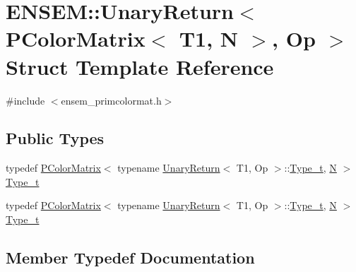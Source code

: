 \hypertarget{structENSEM_1_1UnaryReturn_3_01PColorMatrix_3_01T1_00_01N_01_4_00_01Op_01_4}{}\section{E\+N\+S\+EM\+:\+:Unary\+Return$<$ P\+Color\+Matrix$<$ T1, N $>$, Op $>$ Struct Template Reference}
\label{structENSEM_1_1UnaryReturn_3_01PColorMatrix_3_01T1_00_01N_01_4_00_01Op_01_4}


{\ttfamily \#include $<$ensem\+\_\+primcolormat.\+h$>$}

\subsection*{Public Types}
\begin{DoxyCompactItemize}
\item 
typedef \mbox{\hyperlink{classENSEM_1_1PColorMatrix}{P\+Color\+Matrix}}$<$ typename \mbox{\hyperlink{structENSEM_1_1UnaryReturn}{Unary\+Return}}$<$ T1, Op $>$\+::\mbox{\hyperlink{structENSEM_1_1UnaryReturn_3_01PColorMatrix_3_01T1_00_01N_01_4_00_01Op_01_4_a2b137e72bb2c6ed25df4d747fd568a79}{Type\+\_\+t}}, \mbox{\hyperlink{operator__name__util_8cc_a7722c8ecbb62d99aee7ce68b1752f337}{N}} $>$ \mbox{\hyperlink{structENSEM_1_1UnaryReturn_3_01PColorMatrix_3_01T1_00_01N_01_4_00_01Op_01_4_a2b137e72bb2c6ed25df4d747fd568a79}{Type\+\_\+t}}
\item 
typedef \mbox{\hyperlink{classENSEM_1_1PColorMatrix}{P\+Color\+Matrix}}$<$ typename \mbox{\hyperlink{structENSEM_1_1UnaryReturn}{Unary\+Return}}$<$ T1, Op $>$\+::\mbox{\hyperlink{structENSEM_1_1UnaryReturn_3_01PColorMatrix_3_01T1_00_01N_01_4_00_01Op_01_4_a2b137e72bb2c6ed25df4d747fd568a79}{Type\+\_\+t}}, \mbox{\hyperlink{operator__name__util_8cc_a7722c8ecbb62d99aee7ce68b1752f337}{N}} $>$ \mbox{\hyperlink{structENSEM_1_1UnaryReturn_3_01PColorMatrix_3_01T1_00_01N_01_4_00_01Op_01_4_a2b137e72bb2c6ed25df4d747fd568a79}{Type\+\_\+t}}
\end{DoxyCompactItemize}


\subsection{Member Typedef Documentation}
\mbox{\label{structENSEM_1_1UnaryReturn_3_01PColorMatrix_3_01T1_00_01N_01_4_00_01Op_01_4_a2b137e72bb2c6ed25df4d747fd568a79}} 
